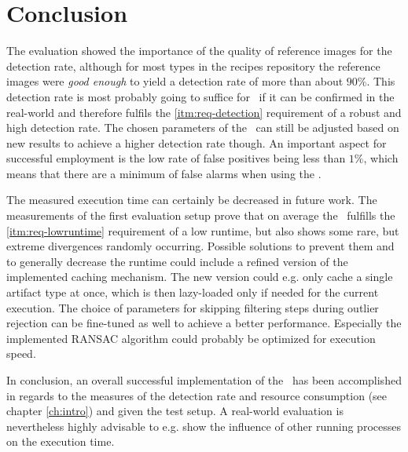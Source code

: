 \chapter{Conclusion}\label{ch:conclusion}

The evaluation showed the importance of the quality of reference images for the detection rate, although for most types in the recipes repository the reference images were \emph{good enough} to yield a detection rate of more than about $90\%$. This detection rate is most probably going to suffice for \ape~if it can be confirmed in the real-world and therefore fulfils the \ref{itm:req-detection} requirement of a robust and high detection rate. The chosen parameters of the \vd~can still be adjusted based on new results to achieve a higher detection rate though. An important aspect for successful employment is the low rate of false positives being less than $1\%$, which means that there are a minimum of false alarms when using the \vd.

The measured execution time can certainly be decreased in future work. The measurements of the first evaluation setup prove that on average the \vd~fulfills the \ref{itm:req-lowruntime} requirement of a low runtime, but also shows some rare, but extreme divergences randomly occurring. Possible solutions to prevent them and to generally decrease the runtime could include a refined version of the implemented caching mechanism. The new version could e.g. only cache a single artifact type at once, which is then lazy-loaded only if needed for the current execution. The choice of parameters for skipping filtering steps during outlier rejection can be fine-tuned as well to achieve a better performance. Especially the implemented RANSAC algorithm could probably be optimized for execution speed.

In conclusion, an overall successful implementation of the \vd~has been accomplished in regards to the measures of the detection rate and resource consumption (see chapter \ref{ch:intro}) and given the test setup. A real-world evaluation is nevertheless highly advisable to e.g. show the influence of other running processes on the execution time.
